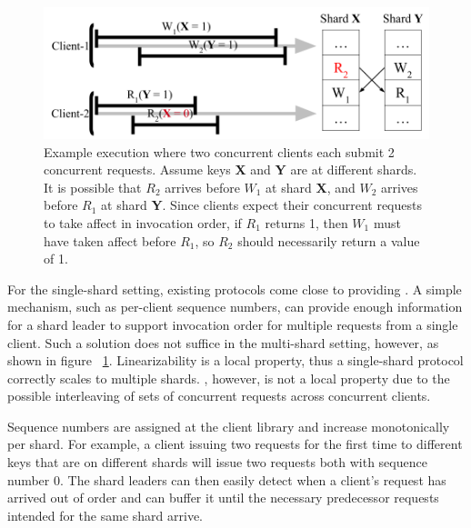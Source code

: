 \begin{figure}[!htb]
    \includegraphics[scale=.45]{somet.png}
    \caption{Example execution where two concurrent clients each submit 2 concurrent requests. Assume keys \textbf{X} and \textbf{Y} are at different shards. It is possible that $R_2$ arrives before $W_1$ at shard \textbf{X}, and $W_2$ arrives before $R_1$ at shard \textbf{Y}. Since clients expect their concurrent requests to take affect in invocation order, if $R_1$ returns 1, then $W_1$ must have taken affect before $R_1$, so $R_2$ should necessarily return a value of 1.}
    \label{fig:concurrentbatches}
\end{figure}

For the single-shard setting, existing protocols come close to providing \MDL{}. A simple mechanism, such as per-client sequence numbers, can provide enough information for a shard leader to support invocation order for multiple requests from a single client. Such a solution does not suffice in the multi-shard setting, however, as shown in figure ~\ref{fig:concurrentbatches}. Linearizability is a local property, thus a single-shard protocol correctly scales to multiple shards. \MDL{}, however, is not a local property due to the possible interleaving of sets of concurrent requests across concurrent clients.

Sequence numbers are assigned at the client library 
and increase monotonically per shard. For example, a client issuing two requests for the first time to different keys that are on different shards will issue two requests both with sequence number 0. The shard leaders can then easily detect when a client's request
has arrived out of order and can buffer it until the necessary predecessor requests intended for the same shard arrive.
